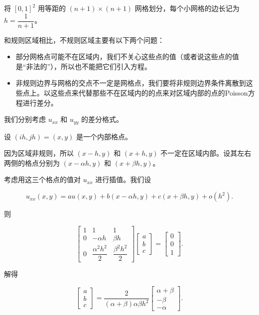 \documentclass{ctexart}
\begin{document}
将 $[0,1]^2$ 用等距的 $(n+1)\times (n+1)$ 网格划分，每个小网格的边长记为 $h=\dfrac 1{n+1}$。

和规则区域相比，不规则区域主要有以下两个问题：

\begin{itemize}
    \item 部分网格点可能不在区域内，我们不关心这些点的值（或者说这些点的值是“非法的”），所以也不能把它们引入方程。
    \item 非规则边界与网格的交点不一定是网格点，我们要将非规则边界条件离散到这些点上。以这些点来代替那些不在区域内的的点来对区域内部的点的Poisson方程进行差分。
\end{itemize}

我们分别考虑 $u_{xx}$ 和 $u_{yy}$ 的差分格式。

设 $(ih,jh)=(x,y)$ 是一个内部格点。

因为区域非规则，所以 $(x-h,y)$ 和 $(x+h,y)$ 不一定在区域内部。设其左右两侧的格点分别为 $(x-\alpha h,y)$ 和 $(x+\beta h,y)$。

考虑用这三个格点的值对 $u_{xx}$ 进行插值。我们设

\begin{equation}
    u_{xx}(x,y) = au(x,y) + b(x-\alpha h,y) + c(x+\beta h,y) + o(h^2).
\end{equation}

则

\begin{equation}
    \begin{bmatrix}
        1 & 1 & 1 \\
        0 & -\alpha h & \beta h \\
        0 & \dfrac{\alpha^2h^2}2 & \dfrac{\beta^2h^2}2
    \end{bmatrix}
    \begin{bmatrix}
        a\\
        b\\
        c
    \end{bmatrix}
    =
    \begin{bmatrix}
        0\\
        0\\
        1
    \end{bmatrix}.
\end{equation}

解得

\begin{equation}
    \begin{bmatrix}
        a\\
        b\\
        c
    \end{bmatrix}
    =
    \dfrac 2{(\alpha+\beta)\alpha\beta h^2}
    \begin{bmatrix}
        \alpha + \beta \\
        -\beta \\
        -\alpha
    \end{bmatrix}.
\end{equation}
\end{document}

